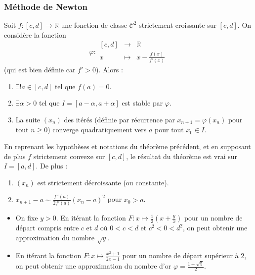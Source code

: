   \subsubsection{Méthode de Newton}


  \begin{theorem}
    Soit $f : [c, d] \rightarrow \mathbb{R}$ une fonction de classe $\mathcal{C}^2$ strictement croissante sur $[c, d]$. On considère la fonction
    \[ \varphi :
    \begin{array}{ccc}
      [c, d] &\rightarrow& \mathbb{R} \\
      x &\mapsto& x - \frac{f(x)}{f'(x)}
    \end{array}
    \]
    (qui est bien définie car $f' > 0$). Alors :
    \begin{enumerate}[label=(\roman*)]
      \item $\exists! a \in [c, d]$ tel que $f(a) = 0$.
      \item $\exists \alpha > 0$ tel que $I = [a - \alpha, a + \alpha]$ est stable par $\varphi$.
      \item La suite $(x_n)$ des itérés (définie par récurrence par $x_{n+1} = \varphi(x_n)$ pour tout $n \geq 0$) converge quadratiquement vers $a$ pour tout $x_0 \in I$.
    \end{enumerate}
  \end{theorem}

  \begin{corollary}
    En reprenant les hypothèses et notations du théorème précédent, et en supposant de plus $f$ strictement convexe sur $[c, d]$, le résultat du théorème est vrai sur $I = [a, d]$. De plus :
    \begin{enumerate}[label=(\roman*)]
      \item $(x_n)$ est strictement décroissante (ou constante).
      \item $x_{n+1} - a \sim \frac{f''(a)}{2f'(a)} (x_n - a)^2$ pour $x_0 > a$.
    \end{enumerate}
  \end{corollary}

  \begin{example}
    \begin{itemize}
      \item On fixe $y > 0$. En itérant la fonction $F : x \mapsto \frac{1}{2} \left( x + \frac{y}{x} \right)$ pour un nombre de départ compris entre $c$ et $d$ où $0 < c < d$ et $c^2 < 0 < d^2$, on peut obtenir une approximation du nombre $\sqrt{y}$.
      \item En itérant la fonction $F : x \mapsto \frac{x^2+1}{2x-1}$ pour un nombre de départ supérieur à $2$, on peut obtenir une approximation du nombre d'or $\varphi = \frac{1+\sqrt{5}}{2}$.
    \end{itemize}
  \end{example}


